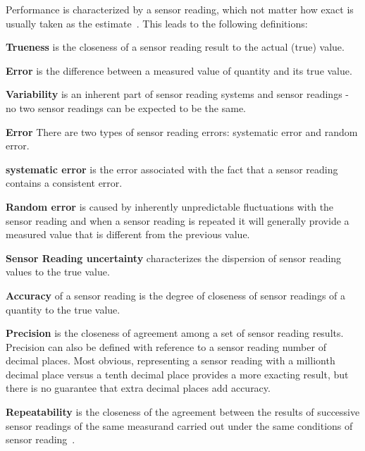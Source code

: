 Performance is characterized by a  sensor reading, which not matter how exact is usually taken as the estimate~\cite{vim2004international}.  This leads to the following definitions:
\begin{description}

\item \textbf{Trueness} is the closeness of a sensor reading result to the actual (true) value.  \item \textbf{Error} is the difference between a measured value of quantity and its true value. 
\item \textbf{Variability} is an inherent part of sensor reading systems and sensor readings - no two sensor readings can be expected to be the same.
\item \textbf{Error} There are two types of sensor reading errors: systematic error and random error. 
\begin{description}
\item \textbf{ systematic error} is the error associated with the fact that a sensor reading contains a consistent error. 

\item \textbf{Random error} is caused by inherently unpredictable fluctuations with the sensor reading and when a sensor reading is repeated it will generally provide a measured value that is different from the previous value. 
\end{description}

\item \textbf{Sensor Reading uncertainty} characterizes the dispersion of sensor reading values to the true value. 
\begin{description}
\item \textbf{Accuracy} of a sensor reading  is the degree of closeness of sensor readings of a quantity to the true value. 
\item \textbf{Precision} is the closeness of agreement among a set of sensor reading results. Precision can also be defined with reference to a sensor reading number of decimal places. Most obvious, representing a sensor reading with a millionth decimal place versus a tenth decimal place provides a more exacting result, but there is no guarantee that extra decimal places add accuracy.  
\item \textbf{Repeatability}
is the closeness of the agreement between the results of successive sensor readings of the same measurand carried out under the same conditions of sensor reading~\cite{jcgm2008evaluation}. 
\end{description}

\end{description}

